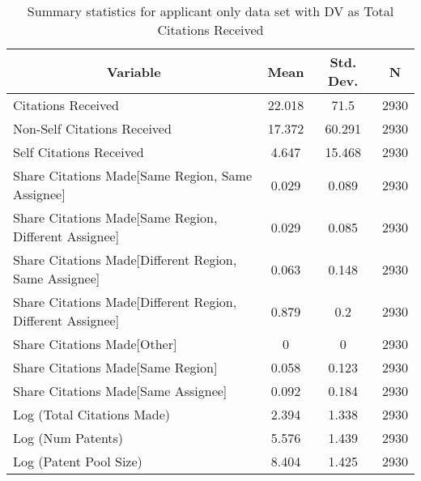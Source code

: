 
\begin{table}[htbp]\centering \caption{Summary statistics for applicant only data set with DV as Total Citations Received \label{a.tsummary}}
\begin{tabular}{l c c  c}\hline\hline
\multicolumn{1}{c}{\textbf{Variable}} & \textbf{Mean}
 & \textbf{Std. Dev.} & \textbf{N}\\ \hline
Citations Received & 22.018 & 71.5  & 2930\\
Non-Self Citations Received & 17.372 & 60.291  & 2930\\
Self Citations Received & 4.647 & 15.468  & 2930\\
Share Citations Made[Same Region, Same Assignee] & 0.029 & 0.089  & 2930\\
Share Citations Made[Same Region, Different Assignee] & 0.029 & 0.085  & 2930\\
Share Citations Made[Different Region, Same Assignee] & 0.063 & 0.148  & 2930\\
Share Citations Made[Different Region, Different Assignee] & 0.879 & 0.2  & 2930\\
Share Citations Made[Other] & 0 & 0  & 2930\\
Share Citations Made[Same Region] & 0.058 & 0.123  & 2930\\
Share Citations Made[Same Assignee] & 0.092 & 0.184  & 2930\\
Log (Total Citations Made) & 2.394 & 1.338  & 2930\\
Log (Num Patents) & 5.576 & 1.439  & 2930\\
Log (Patent Pool Size) & 8.404 & 1.425  & 2930\\
\hline\end{tabular}
\end{table}
